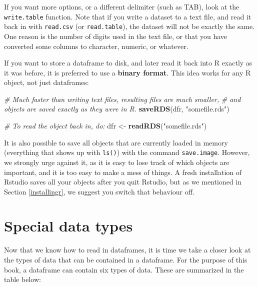 \documentclass[]{book}
\newenvironment{Shaded}{\begin{snugshade}}{\end{snugshade}}
\newcommand{\CommentTok}[1]{\textcolor[rgb]{0.56,0.35,0.01}{\textit{#1}}}
\newcommand{\KeywordTok}[1]{\textcolor[rgb]{0.13,0.29,0.53}{\textbf{#1}}}
\newcommand{\NormalTok}[1]{#1}
\newcommand{\StringTok}[1]{\textcolor[rgb]{0.31,0.60,0.02}{#1}}
\begin{document}
If you want more options, or a different delimiter (such as TAB), look at the \texttt{write.table} function. Note that if you write a dataset to a text file, and read it back in with \texttt{read.csv} (or \texttt{read.table}), the dataset will not be exactly the same. One reason is the number of digits used in the text file, or that you have converted some columns to character, numeric, or whatever.

If you want to store a dataframe to disk, and later read it back into R exactly as it was before, it is preferred to use a \textbf{binary format}. This idea works for any R object, not just dataframes:

\begin{Shaded}
\begin{Highlighting}[]
\CommentTok{# Much faster than writing text files, resulting files are much smaller,}
\CommentTok{# and objects are saved exactly as they were in R.}
\KeywordTok{saveRDS}\NormalTok{(dfr, }\StringTok{"somefile.rds"}\NormalTok{)}

\CommentTok{# To read the object back in, do:}
\NormalTok{dfr <-}\StringTok{ }\KeywordTok{readRDS}\NormalTok{(}\StringTok{"somefile.rds"}\NormalTok{)}
\end{Highlighting}
\end{Shaded}

It is also possible to save all objects that are currently loaded in memory (everything that shows up with \texttt{ls()}) with the command \texttt{save.image}. However, we strongly urge against it, as it is easy to lose track of which objects are important, and it is too easy to make a mess of things. A fresh installation of Rstudio saves all your objects after you quit Rstudio, but as we mentioned in Section \ref{installingr}, we suggest you switch that behaviour off.

\hypertarget{special-data-types}{%
\section{Special data types}\label{special-data-types}}

Now that we know how to read in dataframes, it is time we take a closer look at the types of data that can be contained in a dataframe. For the purpose of this book, a dataframe can contain six types of data. These are summarized in the table below:
\end{document}
